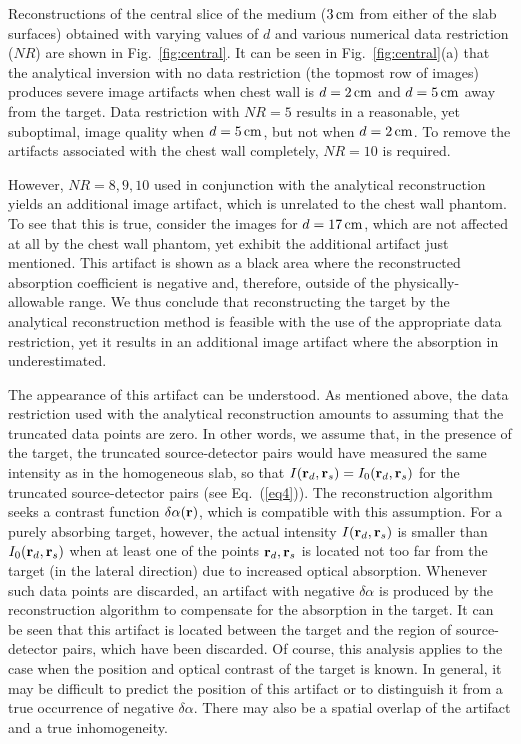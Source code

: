 Reconstructions of the central slice of the medium ($3\,{\rm cm}$ from either of the slab surfaces) obtained with varying values of $d$ and various numerical data restriction ($NR$) are shown in Fig.~\ref{fig:central}. It can be seen in Fig.~\ref{fig:central}(a) that the analytical inversion with no data restriction (the topmost row of images) produces severe image artifacts when chest wall is
$d=2\,{\rm cm}$ and $d=5\,{\rm cm}$ away from the target. Data restriction with $NR=5$ results in a reasonable, yet suboptimal, image quality when $d=5\,{\rm cm}$, but not when $d=2\,{\rm cm}$. To remove
the artifacts associated with the chest wall completely, $NR=10$ is required.

However, $NR = 8,9,10$ used in conjunction with the analytical reconstruction yields an additional image artifact, which is unrelated to the chest wall phantom. To see that this is true, consider the
images for $d=17\,{\rm cm}$, which are not affected at all by the chest wall phantom, yet exhibit the additional artifact just mentioned. This artifact is shown as a black area where the
reconstructed absorption coefficient is negative and, therefore, outside of the physically-allowable range. We thus conclude that reconstructing the target by the analytical reconstruction method is
feasible with the use of the appropriate data restriction, yet it results in an additional image artifact where the absorption in underestimated. 

The appearance of this artifact can be understood. As mentioned above, the data restriction used with the analytical reconstruction amounts to assuming that the truncated data points are zero. In other words, we assume that, in the presence of the target, the truncated source-detector pairs would have measured the same intensity as in the homogeneous slab, so that $I({\bf r}_d,{\bf r}_s) = I_0({\bf r}_d,{\bf r}_s)$ for the truncated source-detector pairs (see Eq.~(\ref{eq4})). The reconstruction algorithm seeks a contrast function $\delta\alpha({\bf r})$, which is compatible with this assumption.  For a purely absorbing target, however, the actual intensity $I({\bf r}_d,{\bf r}_s)$ is smaller than $I_0({\bf r}_d,{\bf r}_s)$ when at least one of the points ${\bf r}_d,{\bf r}_s$ is located not too far from the target (in the lateral direction) due to increased optical absorption. Whenever such data points are discarded, an artifact with negative $\delta\alpha$ is produced by the reconstruction algorithm to compensate for the absorption in the target. It can be seen that this artifact is located between the
target and the region of source-detector pairs, which have been discarded. Of course, this analysis applies to the case when the position and optical contrast of the target is known.  In general, it
may be difficult to predict the position of this artifact or to distinguish it from a true occurrence of negative $\delta\alpha$. There may also be a spatial overlap of the artifact and a true inhomogeneity.

